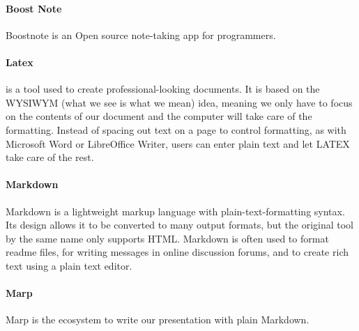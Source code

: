 \paragraph*{Boost Note}
Boostnote is an Open source note-taking app for programmers.

\paragraph*{Latex}
\latex{} is a tool used to create professional-looking documents. It is based on the WYSIWYM (what we see is what we mean) idea, meaning we only have to focus on the contents of our document and the computer will take care of the formatting. Instead of spacing out text on a page to control formatting, as with Microsoft Word or LibreOffice Writer, users can enter plain text and let LATEX take care of the rest.




\paragraph*{Markdown}
Markdown is a lightweight markup language with plain-text-formatting syntax. Its design allows it to be converted to many output formats, but the original tool by the same name only supports HTML. Markdown is often used to format readme files, for writing messages in online discussion forums, and to create rich text using a plain text editor.

\paragraph*{Marp}
Marp is the ecosystem to write our presentation with plain Markdown.


